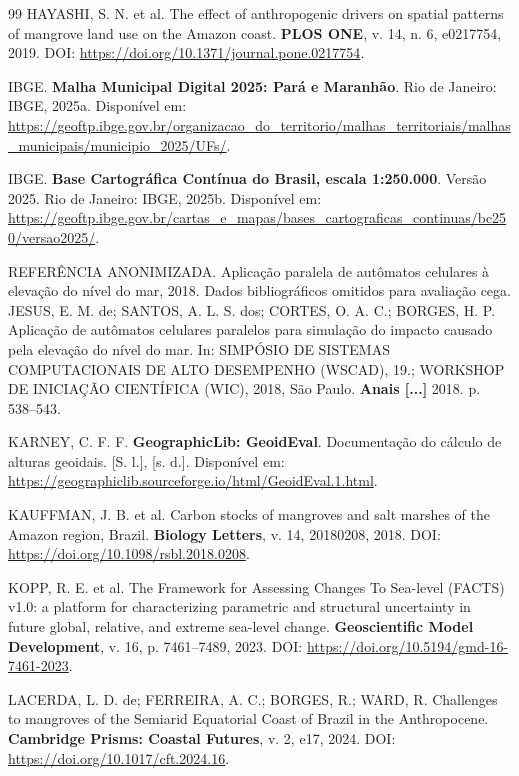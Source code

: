 \documentclass[12pt,a4paper]{article}
\begin{document}
\begin{thebibliography}{99}
HAYASHI, S. N. et al. The effect of anthropogenic drivers on spatial patterns of mangrove land use on the Amazon coast. \textbf{PLOS ONE}, v. 14, n. 6, e0217754, 2019. DOI: \url{https://doi.org/10.1371/journal.pone.0217754}.

IBGE. \textbf{Malha Municipal Digital 2025: Pará e Maranhão}. Rio de Janeiro: IBGE, 2025a. Disponível em: \url{https://geoftp.ibge.gov.br/organizacao_do_territorio/malhas_territoriais/malhas_municipais/municipio_2025/UFs/}.

IBGE. \textbf{Base Cartográfica Contínua do Brasil, escala 1:250.000}. Versão 2025. Rio de Janeiro: IBGE, 2025b. Disponível em: \url{https://geoftp.ibge.gov.br/cartas_e_mapas/bases_cartograficas_continuas/bc250/versao2025/}.

\ifdefined\VersaoCega
{}
REFERÊNCIA ANONIMIZADA. Aplicação paralela de autômatos celulares à elevação do nível do mar, 2018. Dados bibliográficos omitidos para avaliação cega.
\else
{}
JESUS, E. M. de; SANTOS, A. L. S. dos; CORTES, O. A. C.; BORGES, H. P. Aplicação de autômatos celulares paralelos para simulação do impacto causado pela elevação do nível do mar. In: SIMPÓSIO DE SISTEMAS COMPUTACIONAIS DE ALTO DESEMPENHO (WSCAD), 19.; WORKSHOP DE INICIAÇÃO CIENTÍFICA (WIC), 2018, São Paulo. \textbf{Anais [...]} 2018. p. 538--543.
\fi

KARNEY, C. F. F. \textbf{GeographicLib: GeoidEval}. Documentação do cálculo de alturas geoidais. [S. l.], [s. d.]. Disponível em: \url{https://geographiclib.sourceforge.io/html/GeoidEval.1.html}.

KAUFFMAN, J. B. et al. Carbon stocks of mangroves and salt marshes of the Amazon region, Brazil. \textbf{Biology Letters}, v. 14, 20180208, 2018. DOI: \url{https://doi.org/10.1098/rsbl.2018.0208}.

KOPP, R. E. et al. The Framework for Assessing Changes To Sea-level (FACTS) v1.0: a platform for characterizing parametric and structural uncertainty in future global, relative, and extreme sea-level change. \textbf{Geoscientific Model Development}, v. 16, p. 7461--7489, 2023. DOI: \url{https://doi.org/10.5194/gmd-16-7461-2023}.

LACERDA, L. D. de; FERREIRA, A. C.; BORGES, R.; WARD, R. Challenges to mangroves of the Semiarid Equatorial Coast of Brazil in the Anthropocene. \textbf{Cambridge Prisms: Coastal Futures}, v. 2, e17, 2024. DOI: \url{https://doi.org/10.1017/cft.2024.16}.


\end{thebibliography}
\end{document}
